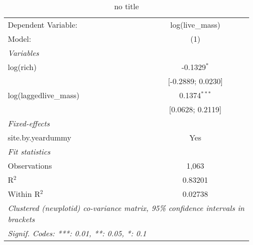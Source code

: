 
\begin{table}[htbp]
   \caption{no title}
   \centering
   \begin{tabular}{lc}
      \tabularnewline \midrule \midrule
      Dependent Variable:    & log(live\_mass)\\   
      Model:                 & (1)\\  
      \midrule
      \emph{Variables}\\
      log(rich)              & -0.1329$^{*}$\\   
                             & [-0.2889; 0.0230]\\   
      log(laggedlive\_mass)  & 0.1374$^{***}$\\   
                             & [0.0628; 0.2119]\\   
      \midrule
      \emph{Fixed-effects}\\
      site.by.yeardummy      & Yes\\  
      \midrule
      \emph{Fit statistics}\\
      Observations           & 1,063\\  
      R$^2$                  & 0.83201\\  
      Within R$^2$           & 0.02738\\  
      \midrule \midrule
      \multicolumn{2}{l}{\emph{Clustered (newplotid) co-variance matrix, 95\% confidence intervals in brackets}}\\
      \multicolumn{2}{l}{\emph{Signif. Codes: ***: 0.01, **: 0.05, *: 0.1}}\\
   \end{tabular}
\end{table}


